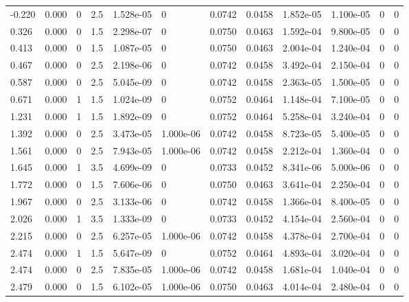 \documentclass[preview]{standalone}
\begin{document}
{{\begin{tabular}{L{1.2cm}C{1.2cm} C{0.3cm}C{0.5cm} C{1.4cm}C{1.4cm} C{1.4cm}C{1.4cm} C{1.6cm}C{1.6cm} C{1.6cm}C{1.6cm}}
  -0.220  &  0.000  & 0     & 2.5 &  1.528e-05  & 0  &  0.0742&   0.0458& 1.852e-05 & 1.100e-05   &  0 & 0  \\ 
  0.326  &  0.000  & 0     & 1.5 &  2.298e-07  & 0  &  0.0750&   0.0463& 1.592e-04 & 9.800e-05   &  0 & 0  \\ 
  0.413  &  0.000  & 0     & 1.5 &  1.087e-05  & 0  &  0.0750&   0.0463& 2.004e-04 & 1.240e-04   &  0 & 0  \\ 
  0.467  &  0.000  & 0     & 2.5 &  2.198e-06  & 0  &  0.0742&   0.0458& 3.492e-04 & 2.150e-04   &  0 & 0  \\ 
  0.587  &  0.000  & 0     & 2.5 &  5.045e-09  & 0  &  0.0742&   0.0458& 2.363e-05 & 1.500e-05   &  0 & 0  \\ 
  0.671  &  0.000  & 1     & 1.5 &  1.024e-09  & 0  &  0.0752&   0.0464& 1.148e-04 & 7.100e-05   &  0 & 0  \\ 
  1.231  &  0.000  & 1     & 1.5 &  1.892e-09  & 0  &  0.0752&   0.0464& 5.258e-04 & 3.240e-04   &  0 & 0  \\ 
  1.392  &  0.000  & 0     & 2.5 &  3.473e-05  & 1.000e-06  &  0.0742&   0.0458& 8.723e-05 & 5.400e-05   &  0 & 0  \\ 
  1.561  &  0.000  & 0     & 2.5 &  7.943e-05  & 1.000e-06  &  0.0742&   0.0458& 2.212e-04 & 1.360e-04   &  0 & 0  \\ 
  1.645  &  0.000  & 1     & 3.5 &  4.699e-09  & 0  &  0.0733&   0.0452& 8.341e-06 & 5.000e-06   &  0 & 0  \\ 
  1.772  &  0.000  & 0     & 1.5 &  7.606e-06  & 0  &  0.0750&   0.0463& 3.641e-04 & 2.250e-04   &  0 & 0  \\ 
  1.967  &  0.000  & 0     & 2.5 &  3.133e-06  & 0  &  0.0742&   0.0458& 1.366e-04 & 8.400e-05   &  0 & 0  \\ 
  2.026  &  0.000  & 1     & 3.5 &  1.333e-09  & 0  &  0.0733&   0.0452& 4.154e-04 & 2.560e-04   &  0 & 0  \\ 
  2.215  &  0.000  & 0     & 2.5 &  6.257e-05  & 1.000e-06  &  0.0742&   0.0458& 4.378e-04 & 2.700e-04   &  0 & 0  \\ 
  2.474  &  0.000  & 1     & 1.5 &  5.647e-09  & 0  &  0.0752&   0.0464& 4.893e-04 & 3.020e-04   &  0 & 0  \\ 
  2.474  &  0.000  & 0     & 2.5 &  7.835e-05  & 1.000e-06  &  0.0742&   0.0458& 1.681e-04 & 1.040e-04   &  0 & 0  \\ 
  2.479  &  0.000  & 0     & 1.5 &  6.102e-05  & 1.000e-06  &  0.0750&   0.0463& 4.014e-04 & 2.480e-04   &  0 & 0  \\ 

\end{tabular}}}
\end{document}
